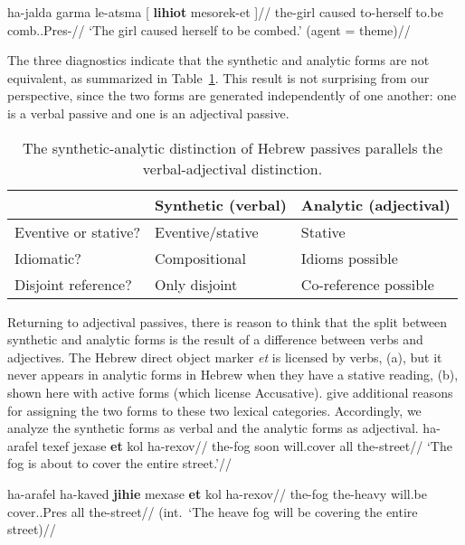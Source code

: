 	\a 	\begingl
	    \gla ha-jalda garma le-atsma [ \textbf{lihiot} mesorek-et ]//
	    \glb the-girl caused to-herself to.be comb..Pres-//
	    \glft `The girl caused herself to be combed.' (agent = theme)//
	    \endgl
\xe

The three diagnostics indicate that the synthetic and analytic forms are not equivalent, as summarized in Table~\ref{table:verbal-adjectival}. This result is not surprising from our perspective, since the two forms are generated independently of one another: one is a verbal passive and one is an adjectival passive.

\begin{table}[ht]
\centering
\begin{tabular}{l|ll}
 & Synthetic (verbal) & Analytic (adjectival) \\\hline
 Eventive or stative? & Eventive/stative  & Stative  \\
 Idiomatic? & Compositional  & Idioms possible  \\
 Disjoint reference? & Only disjoint & Co-reference possible  \\
\end{tabular}
\caption{The synthetic-analytic distinction of Hebrew passives parallels the verbal-adjectival distinction. \label{table:verbal-adjectival}}
\end{table}





Returning to adjectival passives, there is reason to think that the split between synthetic and analytic forms is the result of a difference between verbs and adjectives. The Hebrew direct object marker \emph{et} is licensed by verbs, (\nextx a), but it never appears in analytic forms in Hebrew when they have a stative reading, (\nextx b), shown here with active forms (which license Accusative). \cite{horvathsiloni08} give additional reasons for assigning the two forms to these two lexical categories. Accordingly, we analyze the synthetic forms as verbal and the analytic forms as adjectival.
\pex
	\a \begingl
		\gla ha-arafel texef jexase \textbf{et} kol ha-rexov//
		\glb the-fog soon will.cover  all the-street//
		\glft `The fog is about to cover the entire street.'//
		\endgl
	
	\a \ljudge{*}
		\begingl
		\gla ha-arafel ha-kaved \textbf{jihie} mexase \textbf{et} kol ha-rexov//
		\glb the-fog the-heavy will.be cover..Pres  all the-street//
		\glft (int.~`The heave fog will be covering the entire street)//
		\endgl
\xe

